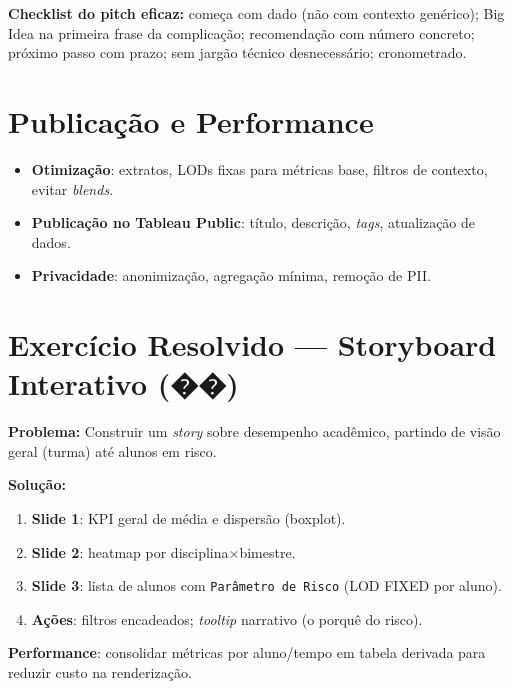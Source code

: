 \textbf{Checklist do pitch eficaz:} começa com dado (não com contexto genérico); Big Idea na primeira frase da complicação; recomendação com número concreto; próximo passo com prazo; sem jargão técnico desnecessário; cronometrado.

\section{Publicação e Performance}
\begin{itemize}[leftmargin=*]
  \item \textbf{Otimização}: extratos, LODs fixas para métricas base, filtros de contexto, evitar \textit{blends}.
  \item \textbf{Publicação no Tableau Public}: título, descrição, \textit{tags}, atualização de dados.
  \item \textbf{Privacidade}: anonimização, agregação mínima, remoção de PII.
\end{itemize}

\section{Exercício Resolvido — Storyboard Interativo (��)}
\begin{SolvedBox}
\textbf{Problema:} Construir um \textit{story} sobre desempenho acadêmico, partindo de visão geral (turma) até alunos em risco.

\textbf{Solução:}
\begin{enumerate}[leftmargin=*]
  \item \textbf{Slide 1}: KPI geral de média e dispersão (boxplot).
  \item \textbf{Slide 2}: heatmap por disciplina$\times$bimestre.
  \item \textbf{Slide 3}: lista de alunos com \texttt{Parâmetro de Risco} (LOD FIXED por aluno).
  \item \textbf{Ações}: filtros encadeados; \textit{tooltip} narrativo (o porquê do risco).
\end{enumerate}
\textbf{Performance}: consolidar métricas por aluno/tempo em tabela derivada para reduzir custo na renderização.
\end{SolvedBox}

